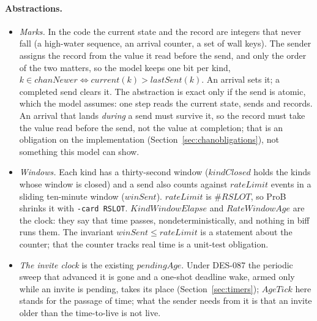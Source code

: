\documentclass[a4paper,10pt,fleqn]{article}
\begin{document}
\paragraph{Abstractions.}
\begin{itemize}
  \item \emph{Marks.}  In the code the current state and the record are
    integers that never fall (a high-water sequence, an arrival counter, a
    set of wall keys).  The sender assigns the record from the value it read
    before the send, and only the order of the two matters, so the model
    keeps one bit per kind, $k \in chanNewer \iff current(k) >
    lastSent(k)$.  An arrival sets it; a completed send clears it.  The
    abstraction is exact only if the send is atomic, which the model assumes:
    one step reads the current state, sends and records.  An arrival that
    lands \emph{during} a send must survive it, so the record must take the
    value read before the send, not the value at completion; that is an
    obligation on the implementation (Section~\ref{sec:chanobligations}),
    not something this model can show.
  \item \emph{Windows.}  Each kind has a thirty-second window
    ($kindClosed$ holds the kinds whose window is closed) and a send also
    counts against $rateLimit$ events in a sliding ten-minute window
    ($winSent$).  $rateLimit$ is $\# RSLOT$, so ProB shrinks it with
    \texttt{-card RSLOT}.  $KindWindowElapse$ and $RateWindowAge$ are the
    clock: they say that time passes, nondeterministically, and nothing in
    biff runs them.  The invariant $winSent \leq rateLimit$ is a statement
    about the counter; that the counter tracks real time is a unit-test
    obligation.
  \item \emph{The invite clock} is the existing $pendingAge$.  Under DES-087
    the periodic sweep that advanced it is gone and a one-shot deadline wake,
    armed only while an invite is pending, takes its place
    (Section~\ref{sec:timers}); $AgeTick$ here stands for
    the passage of time; what the sender needs from it is that an invite
    older than the time-to-live is not live.
\end{itemize}
\end{document}
